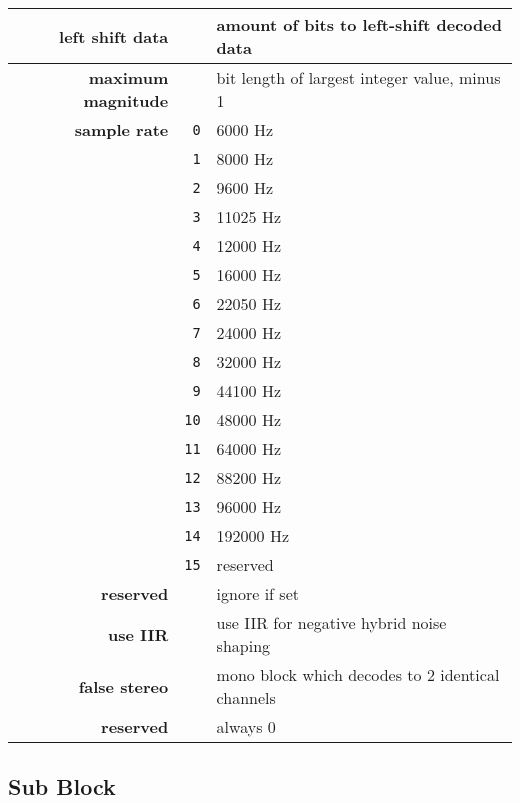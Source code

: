 \begin{table}[h]
{\begin{tabular}{rrl}
\hline
\textbf{left shift data} & & amount of bits to left-shift decoded data \\
\hline
\textbf{maximum magnitude} & & bit length of largest integer value, minus 1 \\
\hline
\textbf{sample rate} & \texttt{0} & 6000 Hz \\
& \texttt{1} & 8000 Hz \\
& \texttt{2} & 9600 Hz \\
& \texttt{3} & 11025 Hz \\
& \texttt{4} & 12000 Hz \\
& \texttt{5} & 16000 Hz \\
& \texttt{6} & 22050 Hz \\
& \texttt{7} & 24000 Hz \\
& \texttt{8} & 32000 Hz \\
& \texttt{9} & 44100 Hz \\
& \texttt{10} & 48000 Hz \\
& \texttt{11} & 64000 Hz \\
& \texttt{12} & 88200 Hz \\
& \texttt{13} & 96000 Hz \\
& \texttt{14} & 192000 Hz \\
& \texttt{15} & reserved \\
\hline
\textbf{reserved} & & ignore if set \\
\hline
\textbf{use IIR} & & use IIR for negative hybrid noise shaping \\
\hline
\textbf{false stereo} & & mono block which decodes to 2 identical channels \\
\hline
\textbf{reserved} & & always 0 \\
\end{tabular}
}
\end{table}

\clearpage

\subsection{Sub Block}

